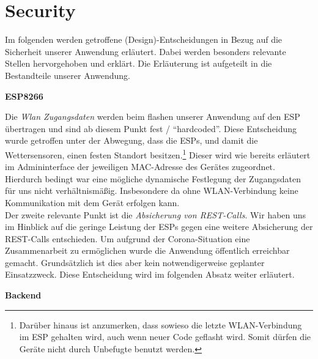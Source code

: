 

\section{Security}\label{Security}
Im folgenden werden getroffene (Design)-Entscheidungen in Bezug auf die Sicherheit unserer Anwendung erläutert.
Dabei werden besonders relevante Stellen hervorgehoben und erklärt.
Die Erläuterung ist aufgeteilt in die Bestandteile unserer Anwendung.

\textbf{ESP8266}

Die \textit{Wlan Zugangsdaten} werden beim flashen unserer Anwendung auf den ESP übertragen und sind ab diesem Punkt fest / \enquote{hardcoded}.
Diese Entscheidung wurde getroffen unter der Abwegung, dass die ESPs, und damit die Wettersensoren, einen festen Standort besitzen.\footnote{Darüber hinaus ist anzumerken, dass sowieso die letzte WLAN-Verbindung im ESP gehalten wird, auch wenn neuer Code geflasht wird. Somit dürfen die Geräte nicht durch Unbefugte benutzt werden.}
Dieser wird wie bereits erläutert im Admininterface der jeweiligen MAC-Adresse des Gerätes zugeordnet.
Hierdurch bedingt war eine mögliche dynamische Festlegung der Zugangsdaten für uns nicht verhältnismäßig.
Insbesondere da ohne WLAN-Verbindung keine Kommunikation mit dem Gerät erfolgen kann.\\
Der zweite relevante Punkt ist die \textit{Absicherung von REST-Calls}.
Wir haben uns im Hinblick auf die geringe Leistung der ESPs gegen eine weitere Absicherung der REST-Calls entschieden.
Um aufgrund der Corona-Situation eine Zusammenarbeit zu ermöglichen wurde die Anwendung öffentlich erreichbar gemacht.
Grundsätzlich ist dies aber kein notwendigerweise geplanter Einsatzzweck.
Diese Entscheidung wird im folgenden Absatz weiter erläutert.

\textbf{Backend}

